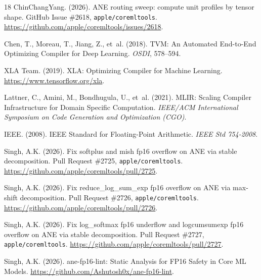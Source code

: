 \documentclass[10pt,twocolumn]{article}
\begin{document}
\begin{thebibliography}{18}
ChinChangYang. (2026).
\newblock ANE routing sweep: compute unit profiles by tensor shape.
\newblock GitHub Issue \#2618, \texttt{apple/coremltools}.
\newblock \url{https://github.com/apple/coremltools/issues/2618}.

Chen, T., Moreau, T., Jiang, Z., et~al. (2018).
\newblock TVM: An Automated End-to-End Optimizing Compiler for
  Deep Learning.
\newblock \textit{OSDI}, 578--594.

XLA Team. (2019).
\newblock XLA: Optimizing Compiler for Machine Learning.
\newblock \url{https://www.tensorflow.org/xla}.

Lattner, C., Amini, M., Bondhugula, U., et~al. (2021).
\newblock MLIR: Scaling Compiler Infrastructure for Domain Specific
  Computation.
\newblock \textit{IEEE/ACM International Symposium on Code
  Generation and Optimization (CGO)}.

IEEE. (2008).
\newblock IEEE Standard for Floating-Point Arithmetic.
\newblock \textit{IEEE Std 754-2008}.

Singh, A.K. (2026).
\newblock Fix softplus and mish fp16 overflow on ANE via stable decomposition.
\newblock Pull Request \#2725, \texttt{apple/coremltools}.
\newblock \url{https://github.com/apple/coremltools/pull/2725}.

Singh, A.K. (2026).
\newblock Fix reduce\_log\_sum\_exp fp16 overflow on ANE via max-shift
  decomposition.
\newblock Pull Request \#2726, \texttt{apple/coremltools}.
\newblock \url{https://github.com/apple/coremltools/pull/2726}.

Singh, A.K. (2026).
\newblock Fix log\_softmax fp16 underflow and logcumsumexp fp16 overflow on ANE
  via stable decomposition.
\newblock Pull Request \#2727, \texttt{apple/coremltools}.
\newblock \url{https://github.com/apple/coremltools/pull/2727}.

Singh, A.K. (2026).
\newblock ane-fp16-lint: Static Analysis for FP16 Safety in Core ML Models.
\newblock \url{https://github.com/Ashutosh0x/ane-fp16-lint}.

\end{thebibliography}

\appendix
\end{document}
